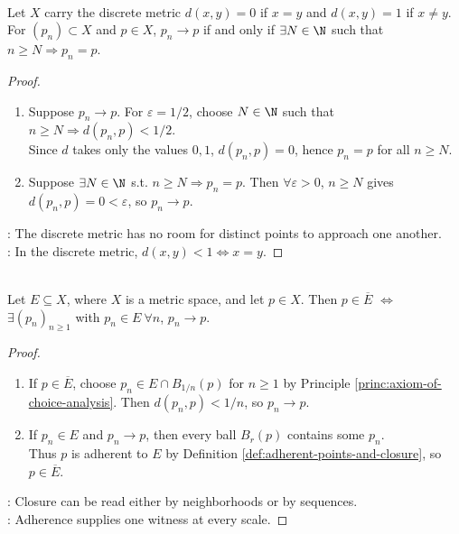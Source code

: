 \begin{proposition} \label{prop:discrete-metric-convergence-eventually-constant} \\
Let $X$ carry the discrete metric $d(x,y)=0$ if $x=y$ and $d(x,y)=1$ if $x\neq y$.\\
For $(p_n)\subset X$ and $p\in X$, $p_n\to p$ if and only if $\exists N\in\N$ such that $n\geq N\Longrightarrow p_n=p$.
\begin{proof}
\begin{enumerate}[label=\roman*.]
\setlength{\itemsep}{0pt}
\item[$(\Rightarrow)$] Suppose $p_n\to p$. For $\varepsilon=1/2$, choose $N\in\N$ such that $n\geq N\Longrightarrow d(p_n,p)<1/2$.\\
Since $d$ takes only the values $0,1$, $d(p_n,p)=0$, hence $p_n=p$ for all $n\geq N$.
\item[$(\Leftarrow)$] Suppose $\exists N\in\N$ s.t. $n\geq N\Longrightarrow p_n=p$. Then $\forall \varepsilon>0$, $n\geq N$ gives $d(p_n,p)=0<\varepsilon$, so $p_n\to p$.
\end{enumerate}
: The discrete metric has no room for distinct points to approach one another.\\
: In the discrete metric, $d(x,y)<1\Longleftrightarrow x=y$.
\end{proof}
\end{proposition}

\begin{proposition} \label{prop:sequential-closure-criterion} \\
Let $E\subseteq X$, where $X$ is a metric space, and let $p\in X$. Then $p\in\overline{E}$ $\Longleftrightarrow$ $\exists (p_n)_{n\geq1}$ with $p_n\in E\ \forall n$, $p_n\to p$.
\begin{proof}
\begin{enumerate}[label=\roman*.]
\setlength{\itemsep}{0pt}
\item[$(\Rightarrow)$] If $p\in\overline{E}$, choose $p_n\in E\cap B_{1/n}(p)$ for $n\geq1$ by Principle \ref{princ:axiom-of-choice-analysis}. Then $d(p_n,p)<1/n$, so $p_n\to p$.
\item[$(\Leftarrow)$] If $p_n\in E$ and $p_n\to p$, then every ball $B_r(p)$ contains some $p_n$.\\
Thus $p$ is adherent to $E$ by Definition \ref{def:adherent-points-and-closure}, so $p\in\overline{E}$.
\end{enumerate}
: Closure can be read either by neighborhoods or by sequences.\\
: Adherence supplies one witness at every scale.
\end{proof}
\end{proposition}

